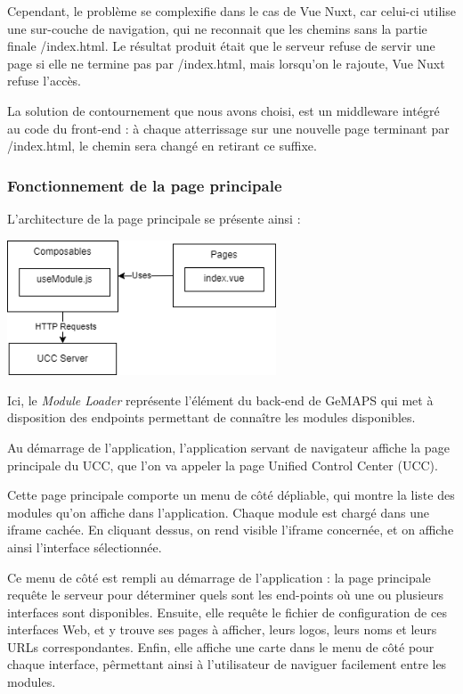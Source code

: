 \documentclass[francais]{rapportPFE}  %
\begin{document}
    Cependant, le problème se complexifie dans le cas de Vue Nuxt, car celui-ci utilise une sur-couche de navigation, qui ne reconnait que les chemins sans la partie finale /index.html. Le résultat produit était que le serveur refuse de servir une page si elle ne termine pas par /index.html, mais lorsqu'on le rajoute, Vue Nuxt refuse l'accès.

    La solution de contournement que nous avons choisi, est un middleware intégré au code du front-end : à chaque atterrissage sur une nouvelle page terminant par /index.html, le chemin sera changé en retirant ce suffixe.






\subsubsection{Fonctionnement de la page principale}

L'architecture de la page principale se présente ainsi :

\begin{center}
    \centering
    \centering
    \includegraphics[width=8cm]{graphics/uccnuxt.png}
    \label{fig:test1}
\end{center}

Ici, le \textit{Module Loader} représente l'élément du back-end de GeMAPS qui met à disposition des endpoints permettant de connaître les modules disponibles.

Au démarrage de l'application, l'application servant de navigateur affiche la page principale du UCC, que l'on va appeler la page Unified Control Center (UCC).

Cette page principale comporte un menu de côté dépliable, qui montre la liste des modules qu'on affiche dans l'application. Chaque module est chargé dans une iframe cachée. En cliquant dessus, on rend visible l'iframe concernée, et on affiche ainsi l'interface sélectionnée.

Ce menu de côté est rempli au démarrage de l'application : la page principale requête le serveur pour déterminer quels sont les end-points où une ou plusieurs interfaces sont disponibles. Ensuite, elle requête le fichier de configuration de ces interfaces Web, et y trouve ses pages à afficher, leurs logos, leurs noms et leurs URLs correspondantes. Enfin, elle affiche une carte dans le menu de côté pour chaque interface, pêrmettant ainsi à l'utilisateur de naviguer facilement entre les modules.
\end{document}
